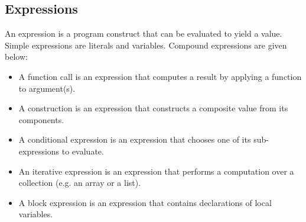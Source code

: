 \documentclass[a4paper, openany]{memoir}
\begin{document}
\subsection{Expressions}
An expression is a program construct that can be evaluated to yield a value. Simple expressions are literals and variables. Compound expressions are given below:
\begin{itemize}
    \item A function call is an expression that computes a result by applying a function to argument(s).
    \item A construction is an expression that constructs a composite value from its components.
    \item A conditional expression is an expression that chooses one of its sub-expressions to evaluate.
    \item An iterative expression is an expression that performs a computation over a collection (e.g. an array or a list).
    \item A block expression is an expression that contains declarations of local variables.
\end{itemize}
\end{document}
